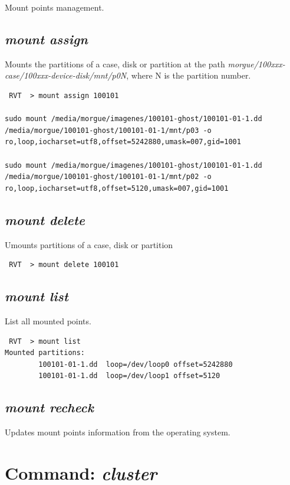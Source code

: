\documentclass[a4paper,11pt,oneside]{report}
\begin{document}
Mount points management.

\subsection{\emph{mount assign}}

Mounts the partitions of a case, disk or partition at the path \emph{morgue/100xxx-case/100xxx-device-disk/mnt/p0N}, where N is the partition number.

\begin{verbatim}
 RVT  > mount assign 100101

sudo mount /media/morgue/imagenes/100101-ghost/100101-01-1.dd /media/morgue/100101-ghost/100101-01-1/mnt/p03 -o ro,loop,iocharset=utf8,offset=5242880,umask=007,gid=1001

sudo mount /media/morgue/imagenes/100101-ghost/100101-01-1.dd /media/morgue/100101-ghost/100101-01-1/mnt/p02 -o ro,loop,iocharset=utf8,offset=5120,umask=007,gid=1001
\end{verbatim}


\subsection{\emph{mount delete}}

Umounts partitions of a case, disk or partition

\begin{verbatim}
 RVT  > mount delete 100101
\end{verbatim}


\subsection{\emph{mount list}}

List all mounted points.

\begin{verbatim}
 RVT  > mount list
Mounted partitions: 
        100101-01-1.dd  loop=/dev/loop0 offset=5242880
        100101-01-1.dd  loop=/dev/loop1 offset=5120
\end{verbatim}


\subsection{\emph{mount recheck}}

Updates mount points information from the operating system.



\section{Command: \emph{cluster}}
\end{document}
